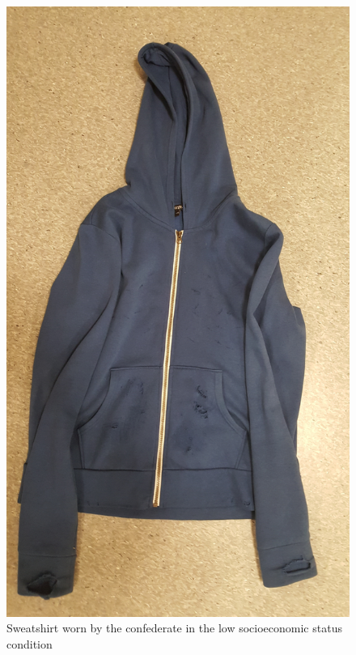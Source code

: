 \documentclass{sfuthesis}
\begin{document}
\begin{figure}
  \begin{center}
    \includegraphics[scale=.90]{Fig4-1a.png}
    \caption{Sweatshirt worn by the confederate in the low socioeconomic status condition}
    \label{fig:seventhfig}
  \end{center}
\end{figure}
\end{document}
